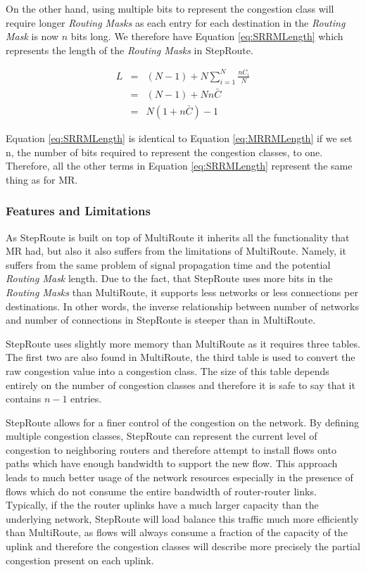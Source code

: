 On the other hand, using multiple bits to represent the congestion class will require longer \textit{Routing Masks} as each entry for each destination in the \textit{Routing Mask} is now $n$ bits long.  We therefore have Equation \ref{eq:SRRMLength} which represents the length of the \textit{Routing Masks} in StepRoute. 

\begin{eqnarray}
 L &=& (N-1) + N\displaystyle\sum\limits_{i=1}^N \frac{nC_{i}}{N} \\
&=& (N - 1) + Nn\bar{C} \\ 
&=& N(1 + n\bar{C}) - 1
\label{eq:SRRMLength}
\end{eqnarray}

Equation \ref{eq:SRRMLength} is identical to Equation \ref{eq:MRRMLength} if we
set n, the number of bits required to represent the congestion classes, to one.
Therefore, all the other terms in Equation \ref{eq:SRRMLength} represent the
same thing as for MR.


\subsubsection{Features and Limitations}

As StepRoute is built on top of MultiRoute it inherits all the functionality that MR had, but also it also suffers from the limitations of MultiRoute. Namely, it suffers from the same problem of signal propagation time and the potential \textit{Routing Mask} length. Due to the fact, that StepRoute uses more bits in the \textit{Routing Masks} than MultiRoute, it supports less networks or less connections per destinations. In other words, the inverse relationship between number of networks and number of connections in StepRoute is steeper than in MultiRoute.

StepRoute uses slightly more memory than MultiRoute as it requires three tables. The first two are also found in MultiRoute, the third table is used to convert the raw congestion value into a congestion class. The size of this table depends entirely on the number of congestion classes and therefore it is safe to say that it contains $n-1$ entries.

StepRoute allows for a finer control of the congestion on the network. By
defining multiple congestion classes, StepRoute can represent the current level
of congestion to neighboring routers and therefore attempt to install flows onto
paths which have enough bandwidth to support the new flow. This approach leads
to much better usage of the network resources especially in the presence of
flows which do not consume the entire bandwidth of router-router links.
Typically, if the the router uplinks have a much larger capacity than the
underlying network, StepRoute will load balance this traffic much more
efficiently than MultiRoute, as flows will always consume a fraction of the
capacity of the uplink and therefore the congestion classes will describe more precisely the partial congestion present on each uplink.

